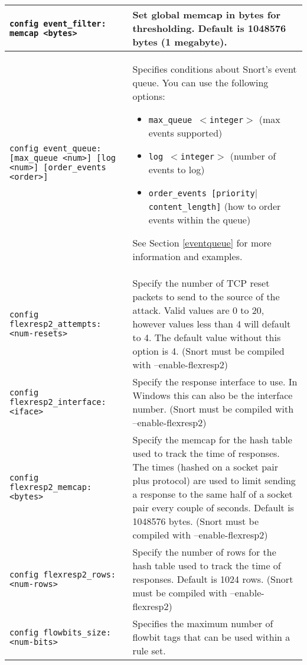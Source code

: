 \documentclass[english]{report}
\begin{document}
\begin{center}
\begin{longtable}[t]{| p{2.5in} | p{3.5in} |}
\hline
\texttt{config event\_filter: memcap <bytes>} & Set global memcap in bytes for
thresholding. Default is 1048576 bytes (1 megabyte). \\

\hline
\texttt{config event\_queue: [max\_queue <num>] [log <num>] [order\_events
<order>]} & Specifies conditions about Snort's event queue. You can use the
following options:

\begin{itemize}
\item \texttt{max\_queue $<$integer$>$} (max events supported)
\item \texttt{log $<$integer$>$} (number of events to log) 
\item \texttt{order\_events [priority$|$content\_length]} (how to order events within the queue)
\end{itemize}

See Section \ref{eventqueue} for more information and examples.\\

\hline
\texttt{config flexresp2\_attempts: <num-resets>} & Specify the number of TCP
reset packets to send to the source of the attack.  Valid values are 0 to 20,
however values less than 4 will default to 4.  The default value without this
option is 4.  (Snort must be compiled with --enable-flexresp2) \\

\hline
\texttt{config flexresp2\_interface: <iface>} & Specify the response interface to
use.  In Windows this can also be the interface number.  (Snort must be
compiled with --enable-flexresp2) \\

\hline
\texttt{config flexresp2\_memcap: <bytes>} & Specify the memcap for the hash
table used to track the time of responses.  The times (hashed on a socket pair
plus protocol) are used to limit sending a response to the same half of a
socket pair every couple of seconds.  Default is 1048576 bytes.  (Snort must be
compiled with --enable-flexresp2) \\

\hline
\texttt{config flexresp2\_rows: <num-rows>} & Specify the number of rows for the
hash table used to track the time of responses.  Default is 1024 rows.  (Snort
must be compiled with --enable-flexresp2) \\

\hline
\texttt{config flowbits\_size: <num-bits>} & Specifies the maximum number of
flowbit tags that can be used within a rule set.\\


\end{longtable}
\end{center}
\end{document}
